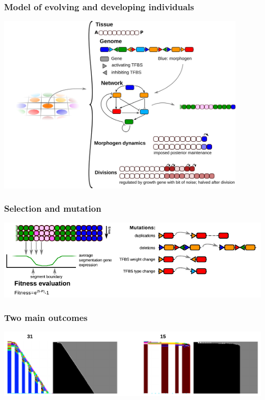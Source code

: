 \documentclass[compress]{beamer}
\begin{document}
\begin{frame}
    \frametitle{Model of evolving and developing individuals}
    \begin{center}
     \includegraphics[width=0.9\textwidth]{figures/individual_growth.png}\\
    \end{center}
\end{frame}

\begin{frame}
    \frametitle{Selection and mutation}
    \begin{center}
     \includegraphics[width=1.\textwidth]{figures/fitness_mutations.pdf}\\
    \end{center}
\end{frame}

\begin{frame}
    \frametitle{Two main outcomes}
     \begin{center}
     \includegraphics[width=1.\textwidth]{figures/two_strategies.pdf}\\
    \end{center}
\end{frame}
\end{document}
